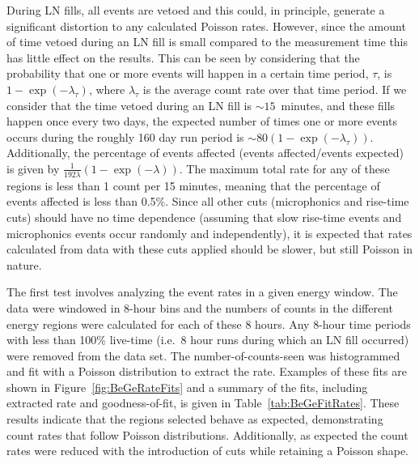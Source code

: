 	During LN fills, all events are vetoed and this could, in principle, generate a significant distortion to any calculated Poisson rates.  However, since the amount of time vetoed during an LN fill is small compared to the measurement time this has little effect on the results.  This can be seen by considering that the probability that one or more events will happen in a certain time period, $\tau$, is $1 - \exp(-\lambda_{\tau})$, where $\lambda_{\tau}$ is the average count rate over that time period.  If we consider that the time vetoed during an LN fill is $\sim15$~minutes, and these fills happen once every two days, the expected number of times one or more events occurs during the roughly 160 day run period is $\sim80 (1 - \exp(-\lambda_{\tau}) )$.  Additionally, the percentage of events affected (events affected/events expected) is given by $\frac{1}{192 \lambda}\left(1 - \exp(-\lambda)\right)$.  The maximum total rate for any of these regions is less than 1 count per 15 minutes, meaning that the percentage of events affected is less than 0.5\%.  Since all other cuts (microphonics and rise-time cuts) should have no time dependence (assuming that slow rise-time events and microphonics events occur randomly and independently), it is expected that rates calculated from data with these cuts applied should be slower, but still Poisson in nature.  
	
	The first test involves analyzing the event rates in a given energy window.  The data were windowed in 8-hour bins and the numbers of counts in the different energy regions were calculated for each of these 8 hours.  Any 8-hour time periods with less than 100\% live-time (i.e.~8 hour runs during which an LN fill occurred) were removed from the data set.  The number-of-counts-seen was histogrammed and fit with a Poisson distribution to extract the rate.  Examples of these fits are shown in	Figure~\ref{fig:BeGeRateFits} and a summary of the fits, including extracted rate and goodness-of-fit, is given in Table~\ref{tab:BeGeFitRates}.  These results indicate that the regions selected behave as expected, demonstrating count rates that follow Poisson distributions.  Additionally, as expected the count rates were reduced with the introduction of cuts while retaining a Poisson shape.  
	
